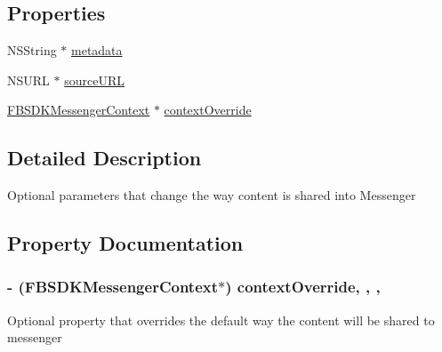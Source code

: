 \subsection*{Properties}
\begin{DoxyCompactItemize}
\item 
N\-S\-String $\ast$ \hyperlink{interface_f_b_s_d_k_messenger_share_options_a1c26e89d9a84686394c45bafc2fbf91e}{metadata}
\item 
N\-S\-U\-R\-L $\ast$ \hyperlink{interface_f_b_s_d_k_messenger_share_options_ab571f0b042b3da2b02458b6861a8274e}{source\-U\-R\-L}
\item 
\hyperlink{interface_f_b_s_d_k_messenger_context}{F\-B\-S\-D\-K\-Messenger\-Context} $\ast$ \hyperlink{interface_f_b_s_d_k_messenger_share_options_af5f9ad68d2865fc8c803a6cf44c28a7a}{context\-Override}
\end{DoxyCompactItemize}


\subsection{Detailed Description}
Optional parameters that change the way content is shared into Messenger 

\subsection{Property Documentation}
\hypertarget{interface_f_b_s_d_k_messenger_share_options_af5f9ad68d2865fc8c803a6cf44c28a7a}{
\subsubsection[{context\-Override}]{\setlength{\rightskip}{0pt plus 5cm}-\/ ({\bf F\-B\-S\-D\-K\-Messenger\-Context}$\ast$) context\-Override\hspace{0.3cm}{\ttfamily [read]}, {\ttfamily [write]}, {\ttfamily [nonatomic]}, {\ttfamily [strong]}}}\label{interface_f_b_s_d_k_messenger_share_options_af5f9ad68d2865fc8c803a6cf44c28a7a}
Optional property that overrides the default way the content will be shared to messenger

